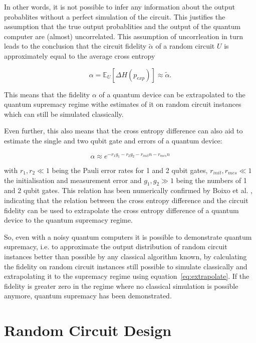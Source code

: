In other words, it is not possible to infer any information about the output
probablites without a perfect simulation of the circuit.
This justifies the assumption that the true output probablities and the output
of the quantum computer are (almost) uncorrelated.
This assumption of uncorrleation in turn leads to the conclusion that the
circuit fidelity $\tilde{\alpha}$ of a random
circuit $U$ is approximately equal to the average cross entropy

\begin{equation}
  \label{eq:extrapolate}
  \alpha = \mathbb{E}_U[\Delta H(p_{exp})] \approx \tilde{\alpha}.
\end{equation}

This means that the fidelity $\alpha$ of a quantum device can be extrapolated to
the quantum supremacy regime withe estimates of it on random circuit instances
which can still be simulated classically.

Even further, this also means that the cross entropy difference can also aid to estimate
the single and two qubit gate and errors of a quantum device:

\begin{equation}
  \alpha \approx e^{-r_1g_1 - r_2g_2 -r_{init}n -r_{mes}n}
\end{equation}

with $r_1, r_2 \ll 1$ being the Pauli error rates for 1 and 2 qubit gates, $r_{init},
r_{mes} \ll 1$ the initialisation and measurement error and $g_1,g_2 \gg 1$ being the
numbers of 1 and 2 qubit gates. This relation has been numerically confirmed by
Boixo et al. \cite{Boixo2018supremacy}, indicating that the relation between the
cross entropy difference and the circuit fidelity can be used to extrapolate the
cross entropy difference of a quantum device to the quantum supremacy regime.

So, even with a noisy quantum computers it is possible to demonstrate quantum
supremacy, i.e. to approximate the output distribution of random circuit instances
better than possible by any classical algorithm known, by
calculating the fidelity on random circuit instances still possible to simulate
classically and extrapolating it to the supremacy regime using
equation~\ref{eq:extrapolate}.
If the fidelity is greater zero in the regime where no classical simulation is possible anymore,
quantum supremacy has been demonstrated.

\section{Random Circuit Design}

